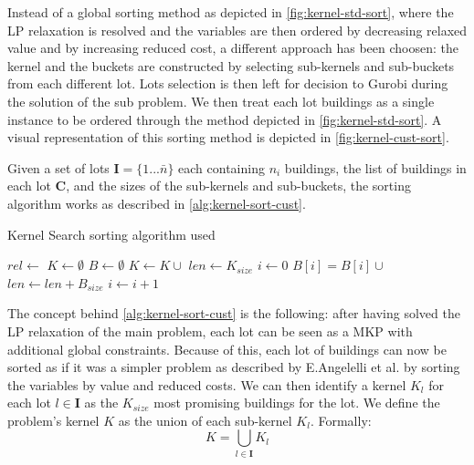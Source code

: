 \documentclass[a4paper, twocolumn, oneside]{article}
\begin{document}
Instead of a global sorting method as depicted in \cref{fig:kernel-std-sort}, where the LP relaxation is resolved and the variables are then ordered by decreasing relaxed value and by increasing reduced cost, a different approach has been choosen: the kernel and the buckets are constructed by selecting sub-kernels and sub-buckets from each different lot. Lots selection is then left for decision to Gurobi during the solution of the sub problem. We then treat each lot buildings as a single instance to be ordered through the method depicted in \cref{fig:kernel-std-sort}. A visual representation of this sorting method is depicted in \cref{fig:kernel-cust-sort}. 

Given a set of lots \(\mathbf{I} = \big\{1...\bar{n}\}\) each containing \(n_i\) buildings, the list of buildings in each lot \(\mathbf{C}\), and the sizes of the sub-kernels and sub-buckets, the sorting algorithm works as described in \cref{alg:kernel-sort-cust}.

\begin{algorithm}
	\caption{Kernel Search sorting algorithm used}\label{alg:kernel-sort-cust}
	\begin{algorithmic}
			\State $rel \gets$ 
			\State $K \gets \emptyset$
			\State $B \gets \emptyset$
				\State {}
				\State $K \gets K \cup $
				\State $len \gets K_{size}$
				\State $i \gets 0$
					\State $B[i] = B[i] \cup$
					\State $len \gets len + B_{size}$
					\State $i \gets i + 1$
				\EndWhile
			\EndFor
			\State {}
		\EndFunction
	\end{algorithmic}
\end{algorithm}

The concept behind \cref{alg:kernel-sort-cust} is the following: after having solved the LP relaxation of the main problem, each lot can be seen as a \ac{MKP} with additional global constraints. Because of this, each lot of buildings can now be sorted as if it was a simpler problem as described by E.Angelelli et al.\cite{angelelli2010kernel} by sorting the variables by value and reduced costs. 
We can then identify a kernel \(K_l\) for each lot \(l \in \textbf{I}\) as the \(K_{size}\) most promising buildings for the lot. We define the problem's kernel \(K\) as the union of each sub-kernel \(K_l\). Formally: \[K = \bigcup_{l \in \mathbf{I}} K_l\]
\end{document}
